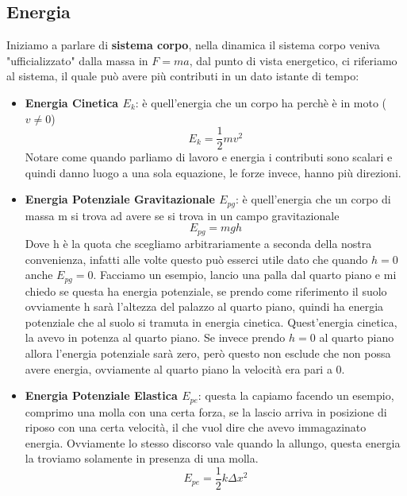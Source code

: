 \documentclass{article}
\numberwithin{equation}{subsection}
\begin{document}
\subsection{Energia}
Iniziamo a parlare di \textbf{sistema corpo}, nella dinamica il sistema corpo veniva "ufficializzato" dalla massa in $F=ma$, dal punto di vista energetico, ci riferiamo al sistema, il quale può avere più contributi in un dato istante di tempo:
\begin{itemize}
    \item \textbf{Energia Cinetica $E_k$}: è quell'energia che un corpo ha perchè è in moto ($v\neq 0$)
    \begin{equation}
        E_k=\frac{1}{2}mv^2
    \end{equation}
    Notare come quando parliamo di lavoro e energia i contributi sono scalari e quindi danno luogo a una sola equazione, le forze invece, hanno più direzioni.
    \item \textbf{Energia Potenziale Gravitazionale $E_{pg}$}: è quell'energia che un corpo di massa m si trova ad avere se si trova in un campo gravitazionale
    \begin{equation}
        E_{pg}=mgh
    \end{equation}
    Dove h è la quota che scegliamo arbitrariamente a seconda della nostra convenienza, infatti alle volte questo può esserci utile dato che quando $h=0$ anche $E_{pg}=0$. Facciamo un esempio, lancio una palla dal quarto piano e mi chiedo se questa ha energia potenziale, se prendo come riferimento il suolo ovviamente h sarà l'altezza del palazzo al quarto piano, quindi ha energia potenziale che al suolo si tramuta in energia cinetica. Quest'energia cinetica, la avevo in potenza al quarto piano. Se invece prendo $h=0$ al quarto piano allora l'energia potenziale sarà zero, però questo non esclude che non possa avere energia, ovviamente al quarto piano la velocità era pari a 0.
    \item \textbf{Energia Potenziale Elastica $E_{pe}$}: questa la capiamo facendo un esempio, comprimo una molla con una certa forza, se la lascio arriva in posizione di riposo con una certa velocità, il che vuol dire che avevo immagazinato energia. Ovviamente lo stesso discorso vale quando la allungo, questa energia la troviamo solamente in presenza di una molla.
    \begin{equation}
        E_{pe}=\frac{1}{2}k\Delta x^2
    \end{equation}
\end{itemize}
\end{document}
